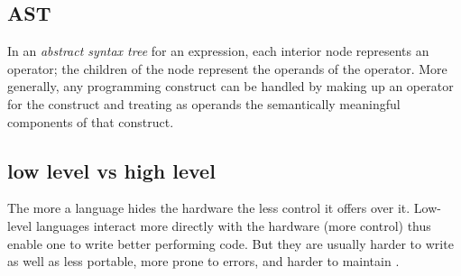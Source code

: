 \subsection{AST}
In an \textit{abstract syntax tree} for an expression, each interior node represents an operator; the children of the node represent the operands of the operator. More generally, any programming construct can be handled by making up an operator for the construct and treating as operands the semantically meaningful components of that construct. 

\subsection{low level vs high level}
The more a language hides the hardware the less control it offers over it. Low-level languages interact more directly with the hardware (more control) thus enable one to write better performing code. But they are usually harder to write as well as less portable, more prone to errors, and harder to maintain .\\